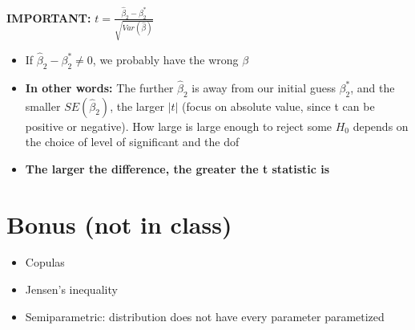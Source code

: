 \documentclass[10pt, oneside]{article}
\begin{document}
\textbf{IMPORTANT:} $t = \frac{\hat \beta_2 - \beta^* _2}{\sqrt{Var(\hat \beta)}}$
\begin{itemize}
    \item If $\hat \beta_2 - \beta_2^* \neq 0$, we probably have the wrong $\beta$
    \item \textbf{In other words:} The further $\hat \beta_2$ is away from our initial guess $\beta_2 ^*$, and the smaller $SE(\hat \beta_2)$, the larger $|t|$ (focus on absolute value, since t can be positive or negative). How large is large enough to reject some $H_0$ depends on the choice of level of significant and the dof
    \item \textbf{The larger the difference, the greater the t statistic is}
\end{itemize}


\section{Bonus (not in class)}
\begin{itemize}
    \item Copulas
    \item Jensen's inequality
    \item Semiparametric: distribution does not have every parameter parametized
\end{itemize}
\end{document}
